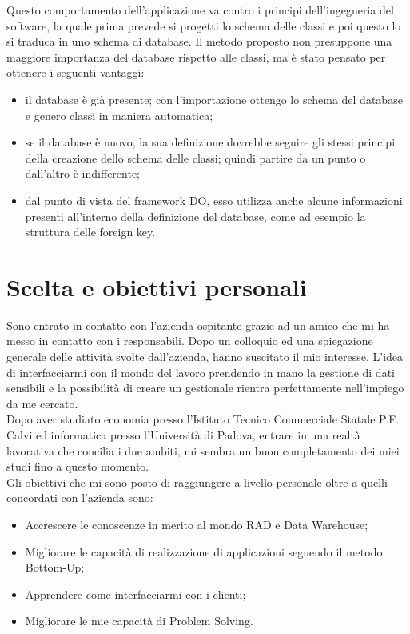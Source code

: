 Questo comportamento dell'applicazione va contro i principi dell'ingegneria del software, la quale prima prevede si progetti lo schema delle classi e poi questo lo si traduca in uno schema di database. Il metodo proposto non presuppone una maggiore importanza del database rispetto alle classi, ma è stato pensato per ottenere i seguenti vantaggi:
\begin{itemize}
	\item il database è già presente; con l'importazione ottengo lo schema del database e genero classi in maniera automatica;
	\item se il database è nuovo, la sua definizione dovrebbe seguire gli stessi principi della	creazione dello schema delle classi; quindi partire da un punto o dall'altro è indifferente;
	\item dal punto di vista del framework DO, esso utilizza anche alcune informazioni presenti all'interno della definizione del database, come ad esempio la struttura delle
	foreign key.
\end{itemize}


\section{Scelta e obiettivi personali}
Sono entrato in contatto con l’azienda ospitante grazie ad un amico che mi ha messo in contatto con i responsabili. Dopo un colloquio ed una spiegazione generale delle attività svolte dall'azienda, hanno suscitato il mio interesse. L'idea di interfacciarmi con il mondo del lavoro prendendo in mano la gestione di dati sensibili e la possibilità di creare un gestionale rientra perfettamente nell'impiego da me cercato.\\
Dopo aver studiato economia presso l'Istituto Tecnico Commerciale Statale P.F. Calvi ed informatica presso l'Università di Padova, entrare in una realtà lavorativa che concilia i due ambiti, mi sembra un buon completamento dei miei studi fino a questo momento.\\
Gli obiettivi che mi sono posto di raggiungere a livello personale oltre a quelli concordati con l'azienda sono: 
\begin{itemize}
	\item Accrescere le conoscenze in merito al mondo RAD e Data Warehouse;
	\item Migliorare le capacità di realizzazione di applicazioni seguendo il metodo Bottom-Up;
	\item Apprendere come interfacciarmi con i clienti;
	\item Migliorare le mie capacità di Problem Solving.
\end{itemize}

\newpage
